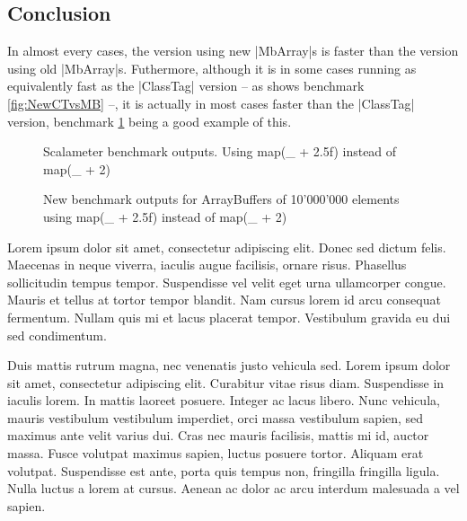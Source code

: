\subsection{Conclusion}

In almost every cases, the version using new |MbArray|s is faster than the version using old |MbArray|s. Futhermore, although it is in some cases running as equivalently fast as the |ClassTag| version -- as shows benchmark \ref{fig:NewCTvsMB} --, it is actually in most cases faster than the |ClassTag| version, benchmark \ref{fig:OtherCTvsMB} being a good example of this. 

\begin{figure}
\caption{Scalameter benchmark outputs. Using map(\_ + 2.5f) instead of map(\_ + 2)}
\label{fig:OtherCTvsMB}
\end{figure}

\begin{figure}
\caption{New benchmark outputs for ArrayBuffers of 10'000'000 elements using map(\_ + 2.5f) instead of map(\_ + 2)}
\label{fig:OtherGcComp}
\end{figure}

Lorem ipsum dolor sit amet, consectetur adipiscing elit. Donec sed dictum felis. Maecenas in neque viverra, iaculis augue facilisis, ornare risus. Phasellus sollicitudin tempus tempor. Suspendisse vel velit eget urna ullamcorper congue. Mauris et tellus at tortor tempor blandit. Nam cursus lorem id arcu consequat fermentum. Nullam quis mi et lacus placerat tempor. Vestibulum gravida eu dui sed condimentum.

Duis mattis rutrum magna, nec venenatis justo vehicula sed. Lorem ipsum dolor sit amet, consectetur adipiscing elit. Curabitur vitae risus diam. Suspendisse in iaculis lorem. In mattis laoreet posuere. Integer ac lacus libero. Nunc vehicula, mauris vestibulum vestibulum imperdiet, orci massa vestibulum sapien, sed maximus ante velit varius dui. Cras nec mauris facilisis, mattis mi id, auctor massa. Fusce volutpat maximus sapien, luctus posuere tortor. Aliquam erat volutpat. Suspendisse est ante, porta quis tempus non, fringilla fringilla ligula. Nulla luctus a lorem at cursus. Aenean ac dolor ac arcu interdum malesuada a vel sapien.

